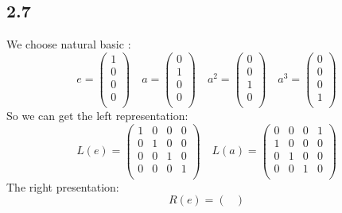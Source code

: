 \documentclass{article}
\begin{document}
\begin{CJK*}{GBK}{song}
\section{2.7}
We choose natural basic :
\begin{equation}
e=
\begin{pmatrix}
     1 \\
     0 \\
     0 \\
     0 \\
\end{pmatrix}\quad
a=
\begin{pmatrix}
     0 \\
     1 \\
     0 \\
     0 \\
\end{pmatrix}\quad
a^2=
\begin{pmatrix}
     0 \\
     0 \\
     1 \\
     0 \\
\end{pmatrix}\quad
a^3=
\begin{pmatrix}
     0 \\
     0 \\
     0 \\
     1 \\
\end{pmatrix}
\end{equation}
So we can get the left representation:
\begin{equation}
L(e)=
\begin{pmatrix}
     1  &  0  &  0  &  0\\
     0  &  1  &  0  &  0\\
     0  &  0  &  1  &  0\\
     0  &  0  &  0  &  1\\
\end{pmatrix}\quad
L(a)=
\begin{pmatrix}
     0  &  0  &  0  &  1\\
     1  &  0  &  0  &  0\\
     0  &  1  &  0  &  0\\
     0  &  0  &  1  &  0\\
\end{pmatrix}
\end{equation}
The right presentation:
\begin{equation}
R(e)=
\begin{pmatrix}

\end{pmatrix}
\end{equation}
\end{CJK*}
\end{document}
